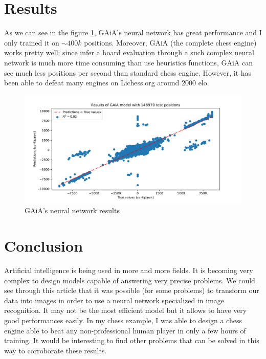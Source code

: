 \documentclass[a4paper]{article}
\begin{document}
\section{Results}
As we can see in the figure \ref{fig:result}, GAiA's neural network
has great performance and I only trained it on $\sim 400k$ positions.
Moreover, GAiA (the complete chess engine) works pretty well:
since infer a board evaluation through a such complex neural network
is much more time consuming than use heuristics functions, GAiA can see
much less positions per second than standard chess engine. However,
it has been able to defeat many engines on Lichess.org around 2000 elo.


\begin{figure}[H]
  \centering
  \includegraphics[width=13cm]{result.pdf}
  \caption{GAiA's neural network results}
  \label{fig:result}
\end{figure}

\section{Conclusion}
Artificial intelligence is being used in more and more fields.
It is becoming very complex to design models capable of answering very precise problems.
We could see through this article that it was possible (for some problems) to transform
our data into images in order to use a neural network specialized in image recognition.
It may not be the most efficient model but it allows to have very good performances easily.
In my chess example, I was able to design a chess engine able to beat any non-professional
human player in only a few hours of training. It would be interesting to find other problems
that can be solved in this way to corroborate these results.



\end{document}
